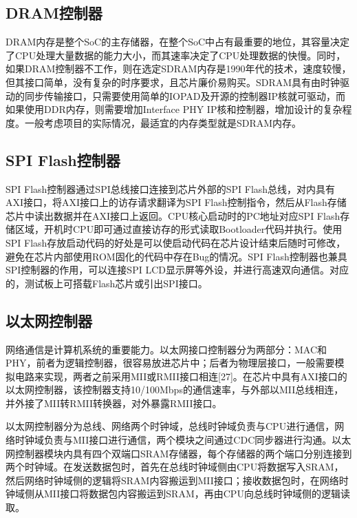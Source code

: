 \subsection{DRAM控制器}\label{sec:12-fpga-verification-006}

DRAM内存是整个SoC的主存储器，在整个SoC中占有最重要的地位，其容量决定了CPU处理大量数据的能力大小，而其速率决定了CPU处理数据的快慢。同时，如果DRAM控制器不工作，则在选定SDRAM内存是1990年代的技术，速度较慢，但其接口简单，没有复杂的时序要求，且芯片廉价易购买。SDRAM具有由时钟驱动的同步传输接口，只需要使用简单的IOPAD及开源的控制器IP核就可驱动，而如果使用DDR内存，则需要增加Interface PHY IP核和控制器，增加设计的复杂程度。一般考虑项目的实际情况，最适宜的内存类型就是SDRAM内存。

\subsection{SPI Flash控制器}\label{sec:12-fpga-verification-007}

SPI Flash控制器通过SPI总线接口连接到芯片外部的SPI Flash总线，对内具有AXI接口，将AXI接口上的访存请求翻译为SPI Flash控制指令，然后从Flash存储芯片中读出数据并在AXI接口上返回。CPU核心启动时的PC地址对应SPI Flash存储区域，开机时CPU即可通过直接访存的形式读取Bootloader代码并执行。使用SPI Flash存放启动代码的好处是可以使启动代码在芯片设计结束后随时可修改，避免在芯片内部使用ROM固化的代码中存在Bug的情况。SPI Flash控制器也兼具SPI控制器的作用，可以连接SPI LCD显示屏等外设，并进行高速双向通信。对应的，测试板上可搭载Flash芯片或引出SPI接口。

\subsection{以太网控制器}\label{sec:12-fpga-verification-008}

网络通信是计算机系统的重要能力。以太网接口控制器分为两部分：MAC和PHY，前者为逻辑控制器，很容易放进芯片中；后者为物理层接口，一般需要模拟电路来实现，两者之前采用MII或RMII接口相连{[}27{]}。在芯片中具有AXI接口的以太网控制器，该控制器支持10/100Mbps的通信速率，与外部以MII总线相连，并外接了MII转RMII转换器，对外暴露RMII接口。

以太网控制器分为总线、网络两个时钟域，总线时钟域负责与CPU进行通信，网络时钟域负责与MII接口进行通信，两个模块之间通过CDC同步器进行沟通。以太网控制器模块内具有四个双端口SRAM存储器，每个存储器的两个端口分别连接到两个时钟域。在发送数据包时，首先在总线时钟域侧由CPU将数据写入SRAM，然后网络时钟域侧的逻辑将SRAM内容搬运到MII接口；接收数据包时，在网络时钟域侧从MII接口将数据包内容搬运到SRAM，再由CPU向总线时钟域侧的逻辑读取。

